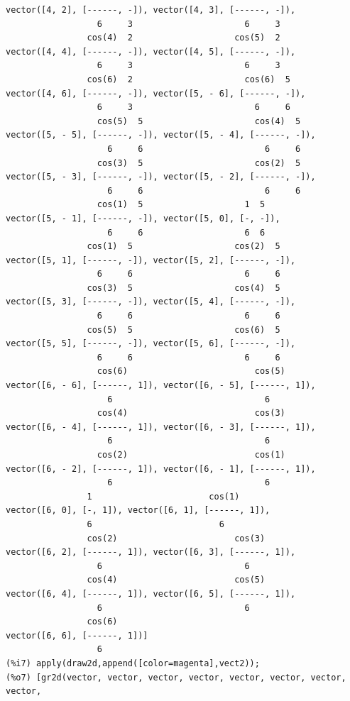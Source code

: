 \documentclass[12pt,letterpaper]{article}
\begin{document}
\begin{verbatim}
vector([4, 2], [------, -]), vector([4, 3], [------, -]), 
                  6     3                      6     3
                cos(4)  2                    cos(5)  2
vector([4, 4], [------, -]), vector([4, 5], [------, -]), 
                  6     3                      6     3
                cos(6)  2                      cos(6)  5
vector([4, 6], [------, -]), vector([5, - 6], [------, -]), 
                  6     3                        6     6
                  cos(5)  5                      cos(4)  5
vector([5, - 5], [------, -]), vector([5, - 4], [------, -]), 
                    6     6                        6     6
                  cos(3)  5                      cos(2)  5
vector([5, - 3], [------, -]), vector([5, - 2], [------, -]), 
                    6     6                        6     6
                  cos(1)  5                    1  5
vector([5, - 1], [------, -]), vector([5, 0], [-, -]), 
                    6     6                    6  6
                cos(1)  5                    cos(2)  5
vector([5, 1], [------, -]), vector([5, 2], [------, -]), 
                  6     6                      6     6
                cos(3)  5                    cos(4)  5
vector([5, 3], [------, -]), vector([5, 4], [------, -]), 
                  6     6                      6     6
                cos(5)  5                    cos(6)  5
vector([5, 5], [------, -]), vector([5, 6], [------, -]), 
                  6     6                      6     6
                  cos(6)                         cos(5)
vector([6, - 6], [------, 1]), vector([6, - 5], [------, 1]), 
                    6                              6
                  cos(4)                         cos(3)
vector([6, - 4], [------, 1]), vector([6, - 3], [------, 1]), 
                    6                              6
                  cos(2)                         cos(1)
vector([6, - 2], [------, 1]), vector([6, - 1], [------, 1]), 
                    6                              6
                1                       cos(1)
vector([6, 0], [-, 1]), vector([6, 1], [------, 1]), 
                6                         6
                cos(2)                       cos(3)
vector([6, 2], [------, 1]), vector([6, 3], [------, 1]), 
                  6                            6
                cos(4)                       cos(5)
vector([6, 4], [------, 1]), vector([6, 5], [------, 1]), 
                  6                            6
                cos(6)
vector([6, 6], [------, 1])]
                  6
(%i7) apply(draw2d,append([color=magenta],vect2));
(%o7) [gr2d(vector, vector, vector, vector, vector, vector, vector, vector, 

\end{verbatim}
\end{document}

